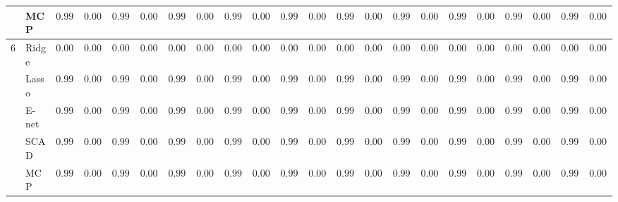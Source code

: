 \begin{tabular}{p{0.2cm}p{1cm}|p{0.6cm}p{0.6cm}|p{0.6cm}p{0.6cm}p{0.6cm}p{0.6cm}p{0.6cm}p{0.6cm}|p{0.6cm}p{0.6cm}p{0.6cm}p{0.6cm}p{0.6cm}p{0.6cm}|p{0.6cm}p{0.6cm}p{0.6cm}p{0.6cm}p{0.6cm}p{0.6cm}}
 & MCP  & $0.9984$ & $0.0018$ & $0.9980$ & $0.0017$ & $0.9984$ & $0.0009$ & $0.9991$ & $0.0004$ & $0.9982$ & $0.0018$ & $0.9982$ & $0.0022$ & $0.9988$ & $0.0012$ & $0.9982$ & $0.0018$ & $0.9987$ & $0.0013$ & $0.9988$ & $0.0011$ \\\hline
6 & Ridge  & $0.0000$ & $0.0000$ & $0.0000$ & $0.0000$ & $0.0000$ & $0.0000$ & $0.0000$ & $0.0000$ & $0.0000$ & $0.0000$ & $0.0000$ & $0.0000$ & $0.0000$ & $0.0000$ & $0.0000$ & $0.0000$ & $0.0000$ & $0.0000$ & $0.0000$ & $0.0000$ \\
 & Lasso  & $0.9995$ & $0.0002$ & $0.9994$ & $0.0008$ & $0.9992$ & $0.0009$ & $0.9987$ & $0.0011$ & $0.9995$ & $0.0000$ & $0.9995$ & $0.0001$ & $0.9994$ & $0.0002$ & $0.9995$ & $0.0001$ & $0.9995$ & $0.0002$ & $0.9992$ & $0.0005$ \\
 & E-net  & $0.9995$ & $0.0002$ & $0.9994$ & $0.0009$ & $0.9991$ & $0.0010$ & $0.9981$ & $0.0018$ & $0.9995$ & $0.0000$ & $0.9995$ & $0.0001$ & $0.9994$ & $0.0002$ & $0.9995$ & $0.0001$ & $0.9994$ & $0.0003$ & $0.9991$ & $0.0009$ \\
 & SCAD  & $0.9952$ & $0.0061$ & $0.9946$ & $0.0051$ & $0.9944$ & $0.0034$ & $0.9977$ & $0.0016$ & $0.9949$ & $0.0069$ & $0.9939$ & $0.0073$ & $0.9969$ & $0.0032$ & $0.9945$ & $0.0061$ & $0.9945$ & $0.0044$ & $0.9969$ & $0.0021$ \\
 & MCP  & $0.9982$ & $0.0020$ & $0.9979$ & $0.0018$ & $0.9983$ & $0.0009$ & $0.9990$ & $0.0003$ & $0.9980$ & $0.0018$ & $0.9979$ & $0.0023$ & $0.9986$ & $0.0016$ & $0.9981$ & $0.0020$ & $0.9983$ & $0.0014$ & $0.9986$ & $0.0011$ \\
\hline 
\end{tabular}

